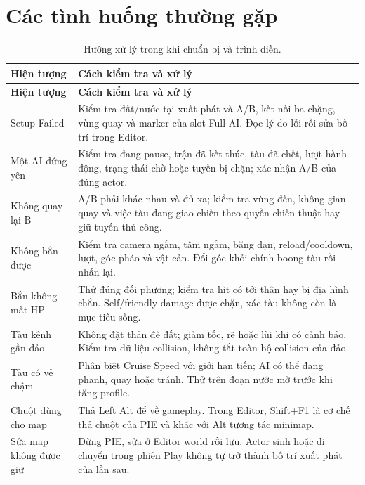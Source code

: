 \documentclass[11pt,a4paper,oneside]{report}
\begin{document}
\clearpage\section{Các tình huống thường gặp}
\begin{longtable}{@{}p{35mm}p{110mm}@{}}
\caption{Hướng xử lý trong khi chuẩn bị và trình diễn.}\\
\toprule\textbf{Hiện tượng}&\textbf{Cách kiểm tra và xử lý}\\\midrule\endfirsthead
\toprule\textbf{Hiện tượng}&\textbf{Cách kiểm tra và xử lý}\\\midrule\endhead
Setup Failed&Kiểm tra đất/nước tại xuất phát và A/B, kết nối ba chặng, vùng quay và marker của slot Full AI. Đọc lý do lỗi rồi sửa bố trí trong Editor.\\
Một AI đứng yên&Kiểm tra đang pause, trận đã kết thúc, tàu đã chết, lượt hành động, trạng thái chờ hoặc tuyến bị chặn; xác nhận A/B của đúng actor.\\
Không quay lại B&A/B phải khác nhau và đủ xa; kiểm tra vùng đến, không gian quay và việc tàu đang giao chiến theo quyền chiến thuật hay giữ tuyến thủ công.\\
Không bắn được&Kiểm tra camera ngắm, tâm ngắm, băng đạn, reload/cooldown, lượt, góc pháo và vật cản. Đổi góc khỏi chính boong tàu rồi nhấn lại.\\
Bắn không mất HP&Thử đúng đối phương; kiểm tra hit có tới thân hay bị địa hình chắn. Self/friendly damage được chặn, xác tàu không còn là mục tiêu sống.\\
Tàu kênh gần đảo&Không đặt thân đè đất; giảm tốc, rẽ hoặc lùi khi có cảnh báo. Kiểm tra dữ liệu collision, không tắt toàn bộ collision của đảo.\\
Tàu có vẻ chậm&Phân biệt Cruise Speed với giới hạn tiến; AI có thể đang phanh, quay hoặc tránh. Thử trên đoạn nước mở trước khi tăng profile.\\
Chuột dùng cho map&Thả Left Alt để về gameplay. Trong Editor, Shift+F1 là cơ chế thả chuột của PIE và khác với Alt tương tác minimap.\\
Sửa map không được giữ&Dừng PIE, sửa ở Editor world rồi lưu. Actor sinh hoặc di chuyển trong phiên Play không tự trở thành bố trí xuất phát của lần sau.\\\bottomrule
\end{longtable}
\end{document}

